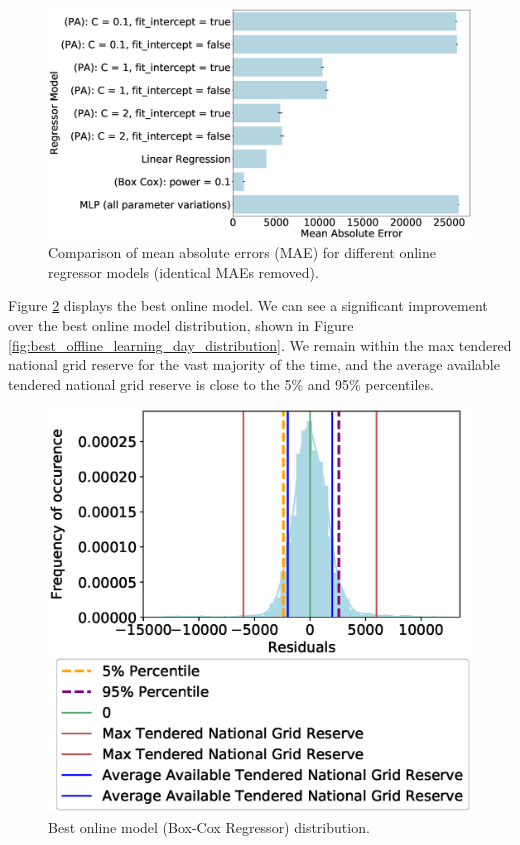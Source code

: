\documentclass[final,3p,times,twocolumn,numbers]{elsarticle}
\begin{document}
\begin{figure}
\includegraphics[width=\columnwidth,natwidth=1300,natheight=1300]{figures/results/online_model_mae_barplot.eps}
\caption{Comparison of mean absolute errors (MAE) for different online regressor models (identical MAEs removed).}
\label{fig:online_model_mae_barplot}
\end{figure}

Figure \ref{fig:best_online_learning_day_distribution} displays the best online model. We can see a significant improvement over the best online model distribution, shown in Figure \ref{fig:best_offline_learning_day_distribution}. We remain within the max tendered national grid reserve for the vast majority of the time, and the average available tendered national grid reserve is close to the 5\% and 95\% percentiles.



\begin{figure}
\centering
\includegraphics[width=\columnwidth,natwidth=500,natheight=500]{figures/results/online_learning_dists-power-0.1.eps}
\caption{Best online model (Box-Cox Regressor) distribution.}
\label{fig:best_online_learning_day_distribution}
\end{figure}
\end{document}
